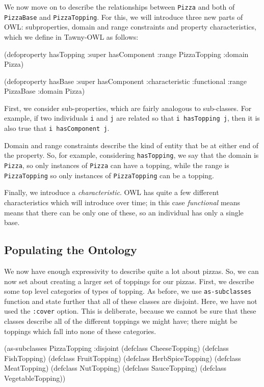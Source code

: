 We now move on to describe the relationships between \verb~Pizza~ and both of
\verb~PizzaBase~ and \verb~PizzaTopping~. For this, we will introduce three new parts of
OWL: subproperties, domain and range constraints and property characteristics,
which we define in Tawny-OWL as follows:

\begin{tawny}
(defoproperty hasTopping
  :super hasComponent
  :range PizzaTopping
  :domain Pizza)

(defoproperty hasBase
  :super hasComponent
  :characteristic :functional
  :range PizzaBase
  :domain Pizza)
\end{tawny}


First, we consider sub-properties, which are fairly analogous to sub-classes.
For example, if two individuals \verb~i~ and \verb~j~ are related so that \verb~i hasTopping j~, then it is also true that \verb~i hasComponent j~.

Domain and range constraints describe the kind of entity that be at either end
of the property. So, for example, considering \verb~hasTopping~, we say that the
domain is \verb~Pizza~, so only instances of \verb~Pizza~ can have a topping, while the
range is \verb~PizzaTopping~ so only instances of \verb~PizzaTopping~ can be a topping. 

Finally, we introduce a \emph{characteristic}. OWL has quite a few different
characteristics which will introduce over time; in this case \emph{functional}
means means that there can be only one of these, so an individual has only a
single base.


\subsection{Populating the Ontology}
\label{sec-5-4}

We now have enough expressivity to describe quite a lot about pizzas. So, we
can now set about creating a larger set of toppings for our pizzas. First, we
describe some top level categories of types of topping. As before, we use
\verb~as-subclasses~ function and state further that all of these classes are
disjoint. Here, we have not used the \verb~:cover~ option. This is deliberate,
because we cannot be sure that these classes describe all of the different
toppings we might have; there might be toppings which fall into none of these
categories. 

\begin{tawny}
(as-subclasses
 PizzaTopping
 :disjoint
 (defclass CheeseTopping)
 (defclass FishTopping)
 (defclass FruitTopping)
 (defclass HerbSpiceTopping)
 (defclass MeatTopping)
 (defclass NutTopping)
 (defclass SauceTopping)
 (defclass VegetableTopping))
\end{tawny}

